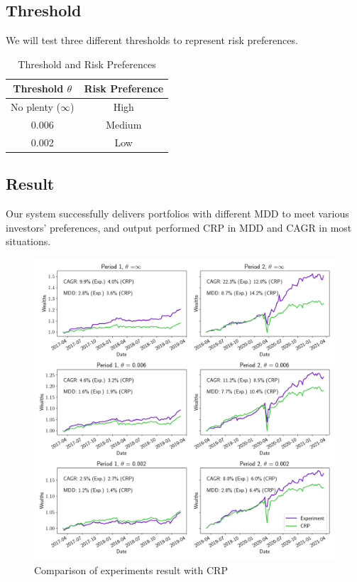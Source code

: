 \subsection{Threshold}
We will test three different thresholds to represent risk preferences.  
\begin{table}[htb]
    \centering
    \begin{tabular}{||c|c||}
    \hline \hline
    Threshold $\theta$ & Risk Preference \\ \hline
    No plenty ($\infty$) & High \\ \hline
    0.006 & Medium      \\ \hline
    0.002 & Low      \\ \hline    
    \hline \hline
    \end{tabular}
    \caption{Threshold and Risk Preferences}
    \label{tab:threshold}
\end{table}
\subsection{Result}
Our system successfully delivers portfolios with different MDD to meet various investors' preferences, and output performed CRP in MDD and CAGR in most situations.

\begin{figure}[htb]
\centering
  \includegraphics[width=16cm]{images/crp_compare.png}
  \caption [Comparison of experiments result with CRP]{Comparison of experiments result with CRP}
  \label{fig:crp_compare}
\end{figure}